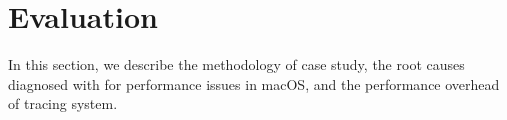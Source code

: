 \section{Evaluation}\label{sec:eval}

In this section, we describe the methodology of case study, the root causes
diagnosed with \xxx for performance issues in macOS,  and the performance
overhead of \xxx tracing system.





